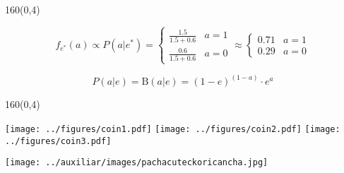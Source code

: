 \documentclass[shownotes,aspectratio=169]{beamer}
\newif\ifen
\newif\ifes
\newcommand{\en}[1]{\ifen#1\fi}
\newcommand{\es}[1]{\ifes#1\fi}
\begin{document}
\begin{frame}[plain]
\begin{textblock}{160}(0,4)
 \centering \LARGE
\en{Base model}
\end{textblock}
\vspace{1cm}

\begin{equation*}
f_{e^*}(a) \propto  P(a|e^*) = \begin{cases}
 \frac{1.5}{1.5+0.6} & a = 1 \\
 \frac{0.6}{1.5+0.6} & a = 0
  \end{cases}
  \approx
\begin{cases}
 0.71 & a= 1 \\
 0.29 & a= 0
\end{cases}
\end{equation*}

\pause

\vspace{0.3cm}

\begin{equation*}
P(a|e) = \text{B}(a|e) = (1-e)^{(1-a)} \cdot e^a 
\end{equation*}

\pause
\vspace{0.5cm}

\end{frame}

\begin{frame}[plain]
\begin{textblock}{160}(0,4)
 \centering \LARGE
\en{Base model}
\end{textblock}
\vspace{1cm}


\centering
{}

\vspace{0.6cm}
\pause

\texttt{[image: ../figures/coin1.pdf]}
\texttt{[image: ../figures/coin2.pdf]}   
\texttt{[image: ../figures/coin3.pdf]}
    

\end{frame}

\begin{frame}[plain]

\centering
  \texttt{[image: ../auxiliar/images/pachacuteckoricancha.jpg]}
\end{frame}
\end{document}

